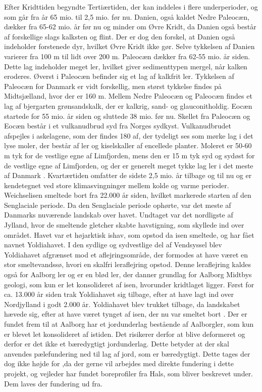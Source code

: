 Efter Kridttiden begyndte Tertiærtiden, der kan inddeles i flere underperioder, og som går fra år 65 mio. til 2,5 mio. før nu. Danien, også kaldet Nedre Paleocæn, dækker fra 65-62 mio. år før nu og minder om Øvre Kridt, da Danien også består af forskellige slags kalksten og flint. Der er dog den forskel, at Danien også indeholder forstenede dyr, hvilket Øvre Kridt ikke gør. Selve tykkelsen af Danien varierer fra 100 m til lidt over 200 m. Paleocæn dækker fra 62-55 mio. år siden. Dette lag indeholder meget ler, hvilket giver sedimenttypen mergel, når kalken eroderes. Øverst i Paleocæn befinder sig et lag af kalkfrit ler. Tykkelsen af Paleocæn for Danmark er vidt forskellig, men størst tykkelse findes på Midtsjælland, hvor der er 160 m. Mellem Nedre Paleocæn og Paleocæn findes et lag af bjergarten grønsandskalk, der er kalkrig, sand- og glauconitholdig.
\newline \indent{     }  Eocæn startede for 55 mio. år siden og sluttede 38 mio. før nu. Skellet fra Paleocæn og Eocæn består i et vulkanudbrud syd fra Norges sydkyst. Vulkanudbrudet afspejles i askelagene, som der findes 180 af, der tydeligt ses som mørke lag i det lyse moler, der består af ler og kiselskaller af encellede planter. Moleret er 50-60 m tyk for de vestlige egne af Limfjorden, mens den er 15 m tyk syd og sydøst for de vestlige egne af Limfjorden, og der er generelt meget tykke lag ler i det meste af Danmark \citep{geopdf}.
\newline
\newline
Kvartærtiden omfatter de sidste 2,5 mio. år tilbage og til nu og er kendetegnet ved store klimasvingninger mellem kolde og varme perioder. Weichselisen smeltede bort fra 22.000 år siden, hvilket markerede starten af den Senglaciale periode. Da den Senglaciale periode ophørte, var det meste af Danmarks nuværende landskab over havet. Undtaget var det nordligste af Jylland, hvor de smeltende gletcher skabte havstigning, som skyllede ind over området. Havet var et højarktisk ishav, som opstod da isen smeltede, og har fået navnet Yoldiahavet. I den sydlige og sydvestlige del af Vendsyssel blev Yoldiahavet afgrænset mod et aflejringsområde, der formodes at have været en stor smeltevandssø, hvori en skalfri leraflejring opstod. Denne leraflejring kaldes også for Aalborg ler og er en blød ler, der danner grundlag for Aalborg Midtbys geologi, som kun er let konsolideret af isen, hvorunder kridtlaget ligger. Først for ca. 13.000 år siden trak Yoldiahavet sig tilbage, efter at have lagt ind over Nordjylland i godt 2.000 år. Yoldiahavet blev trukket tilbage, da landskabet hævede sig, efter at have været tynget af isen, der nu var smeltet bort \citep{geopdf}.
\newline \indent{     }  Der er fundet frem til at Aalborg har et jordunderlag bestående af Aalborgler, som kun er blevet let konsolideret af istiden. Det risikerer derfor at  blive deformeret og derfor er det ikke et bæredygtigt jordunderlag. Dette betyder at der skal anvendes pælefundering ned til lag af jord, som er bæredygtigt. Dette tages der dog ikke højde for ,da der gerne vil arbejdes med direkte fundering i dette projekt, og vejleder har fundet boreprofiler fra Hals, som bliver beskrevet under. Dem laves der fundering ud fra. 


